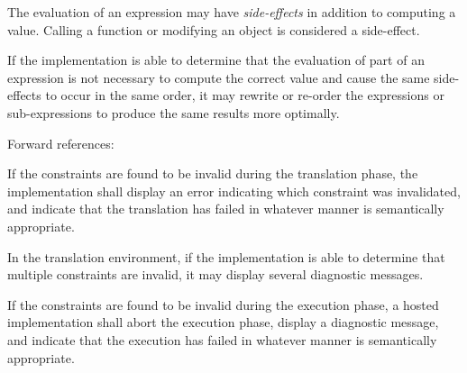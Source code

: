 
\specsubsubitem
The evaluation of an expression may have \textit{side-effects} in addition to
computing a value. Calling a function or modifying an object is considered a
side-effect.

\specsubsubitem
If the implementation is able to determine that the evaluation of part of an
expression is not necessary to compute the correct value and cause the same
side-effects to occur in the same order, it may rewrite or re-order the
expressions or sub-expressions to produce the same results more optimally.


Forward references: 


\specsubitem
If the constraints are found to be invalid during the translation phase, the
implementation shall display an error indicating which constraint was
invalidated, and indicate that the translation has failed in whatever manner is
semantically appropriate.


\specsubitem
In the translation environment, if the implementation is able to determine that
multiple constraints are invalid, it may display several diagnostic messages.

\specsubitem
If the constraints are found to be invalid during the execution phase, a hosted
implementation shall abort the execution phase, display a diagnostic message,
and indicate that the execution has failed in whatever manner is semantically
appropriate.
